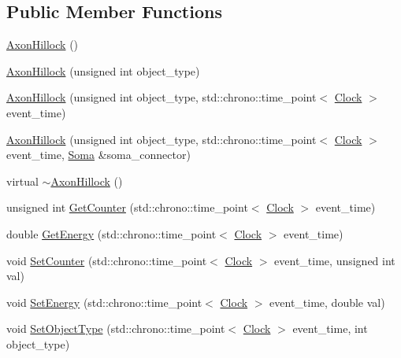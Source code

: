 \subsection*{Public Member Functions}
\begin{DoxyCompactItemize}
\item 
\mbox{\hyperlink{classAxonHillock_a432095dfb25ece393cdd83b5eb4f097a}{Axon\+Hillock}} ()
\item 
\mbox{\hyperlink{classAxonHillock_a20a4da0885f32bfca34ab5cda2a13562}{Axon\+Hillock}} (unsigned int object\+\_\+type)
\item 
\mbox{\hyperlink{classAxonHillock_acc61c61c8dfddd603e868a2fcbfd5e9c}{Axon\+Hillock}} (unsigned int object\+\_\+type, std\+::chrono\+::time\+\_\+point$<$ \mbox{\hyperlink{universe_8h_a0ef8d951d1ca5ab3cfaf7ab4c7a6fd80}{Clock}} $>$ event\+\_\+time)
\item 
\mbox{\hyperlink{classAxonHillock_a250945e24a51475369b6c7881c0d955b}{Axon\+Hillock}} (unsigned int object\+\_\+type, std\+::chrono\+::time\+\_\+point$<$ \mbox{\hyperlink{universe_8h_a0ef8d951d1ca5ab3cfaf7ab4c7a6fd80}{Clock}} $>$ event\+\_\+time, \mbox{\hyperlink{classSoma}{Soma}} \&soma\+\_\+connector)
\item 
virtual \mbox{\hyperlink{classAxonHillock_ae86220026d7c87edc1c514521d66f992}{$\sim$\+Axon\+Hillock}} ()
\item 
unsigned int \mbox{\hyperlink{classAxonHillock_a429c9876d679fe8de4533725afc4875c}{Get\+Counter}} (std\+::chrono\+::time\+\_\+point$<$ \mbox{\hyperlink{universe_8h_a0ef8d951d1ca5ab3cfaf7ab4c7a6fd80}{Clock}} $>$ event\+\_\+time)
\item 
double \mbox{\hyperlink{classAxonHillock_ab5ac3ab8771b96acf7e3fa07152525a5}{Get\+Energy}} (std\+::chrono\+::time\+\_\+point$<$ \mbox{\hyperlink{universe_8h_a0ef8d951d1ca5ab3cfaf7ab4c7a6fd80}{Clock}} $>$ event\+\_\+time)
\item 
void \mbox{\hyperlink{classAxonHillock_a0220cee0ad99ddc48496982078c1856c}{Set\+Counter}} (std\+::chrono\+::time\+\_\+point$<$ \mbox{\hyperlink{universe_8h_a0ef8d951d1ca5ab3cfaf7ab4c7a6fd80}{Clock}} $>$ event\+\_\+time, unsigned int val)
\item 
void \mbox{\hyperlink{classAxonHillock_a830afd18810e0eaa11a9e7a500b8f0c4}{Set\+Energy}} (std\+::chrono\+::time\+\_\+point$<$ \mbox{\hyperlink{universe_8h_a0ef8d951d1ca5ab3cfaf7ab4c7a6fd80}{Clock}} $>$ event\+\_\+time, double val)
\item 
void \mbox{\hyperlink{classAxonHillock_ad2c1890796e6f72ef631abb17a4b6532}{Set\+Object\+Type}} (std\+::chrono\+::time\+\_\+point$<$ \mbox{\hyperlink{universe_8h_a0ef8d951d1ca5ab3cfaf7ab4c7a6fd80}{Clock}} $>$ event\+\_\+time, int object\+\_\+type)

\end{DoxyCompactItemize}
